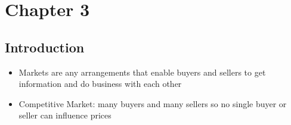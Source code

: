 \documentclass[11pt]{article}
\author{Sudhan Chitgopkar}
\date{\today}
\title{}
\begin{document}
\tableofcontents

\section{Chapter 3}
\label{sec:org7924754}
\subsection{Introduction}
\label{sec:org97eba1d}
\begin{itemize}
\item Markets are any arrangements that enable buyers and sellers to get information
and do business with each other
\item Competitive Market: many buyers and many sellers so no single buyer or seller can
influence prices
\end{itemize}
\end{document}
